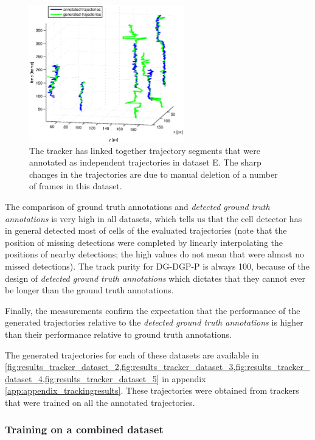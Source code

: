 		\begin{figure}[h]
			\centering				\includegraphics[width=0.6\textwidth]{images/fig_results_tracking_analysis_4}
			\caption{The tracker has linked together trajectory segments that were annotated as independent trajectories in dataset E. The sharp changes in the trajectories are due to manual deletion of a number of frames in this dataset.}
			\label{fig:results_tracking_analysisD}
		\end{figure}
		
		The comparison of ground truth annotations and \textit{detected ground truth annotations} is very high in all datasets, which tells us that the cell detector has in general detected most of cells of the evaluated trajectories (note that the position of missing detections were completed by linearly interpolating the positions of nearby detections; the high values do not mean that were almost no missed detections). The track purity for DG-DGP-P is always 100, because of the design of \textit{detected ground truth annotations} which dictates that they cannot ever be longer than the ground truth annotations.
		
		Finally, the measurements confirm the expectation that the performance of the generated trajectories relative to the \textit{detected ground truth annotations} is higher than their performance relative to ground truth annotations.
		
		The generated trajectories for each of these datasets are available in \cref{fig:results_tracker_dataset_2,fig:results_tracker_dataset_3,fig:results_tracker_dataset_4,fig:results_tracker_dataset_5} in appendix \ref{app:appendix_trackingresults}. These trajectories were obtained from trackers that were trained on all the annotated trajectories.
		
		\subsubsection{Training on a combined dataset \statusfirstdraft}
		
